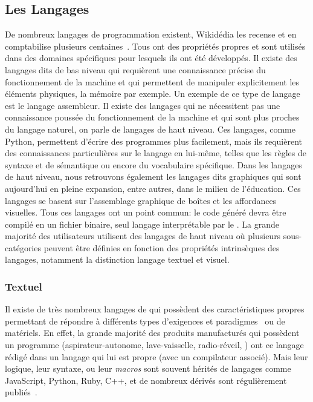     \subsection{Les Langages}
        De nombreux langages de programmation existent, Wikidédia les recense et en comptabilise plusieurs centaines~. Tous ont des propriétés propres et sont utilisés dans des domaines spécifiques pour lesquels ils ont été développés.
            Il existe des langages dits de bas niveau qui requièrent une connaissance précise du fonctionnement de la machine et qui permettent de manipuler explicitement les éléments physiques, la mémoire par exemple. Un exemple de ce type de langage est le langage assembleur.
            Il existe des langages qui ne nécessitent pas une connaissance poussée du fonctionnement de la machine et qui sont plus proches du langage naturel, on parle de langages de haut niveau. Ces langages, comme Python, permettent d'écrire des programmes plus facilement, mais ils requièrent des connaissances particulières sur le langage en lui-même, telles que les règles de syntaxe et de sémantique ou encore du vocabulaire spécifique.
            Dans les langages de haut niveau, nous retrouvons également les langages dits graphiques qui sont aujourd'hui en pleine expansion, entre autres, dans le milieu de l'éducation. Ces langages se basent sur l'assemblage graphique de boîtes et les affordances visuelles.
            Tous ces langages ont un point commun: le code généré devra être compilé en un fichier binaire, seul langage interprétable par le .
            La grande majorité des utilisateurs utilisent des langages de haut niveau où plusieurs sous-catégories peuvent être définies en fonction des propriétés intrinsèques des langages, notamment la distinction langage textuel et visuel.
        \subsubsection{Textuel}
            Il existe de très nombreux langages de  qui possèdent des caractéristiques propres permettant de répondre à différents types d'exigences et paradigmes~ ou de matériels. En effet, la grande majorité des produits manufacturés qui possèdent un programme (aspirateur-autonome, lave-vaisselle, radio-réveil, \etc) ont ce langage rédigé dans un langage qui lui est propre (avec un compilateur associé). Mais leur logique, leur syntaxe, ou leur \textit{macros} sont souvent hérités de langages  comme JavaScript, Python, Ruby, C++, et de nombreux dérivés sont régulièrement publiés~. 
